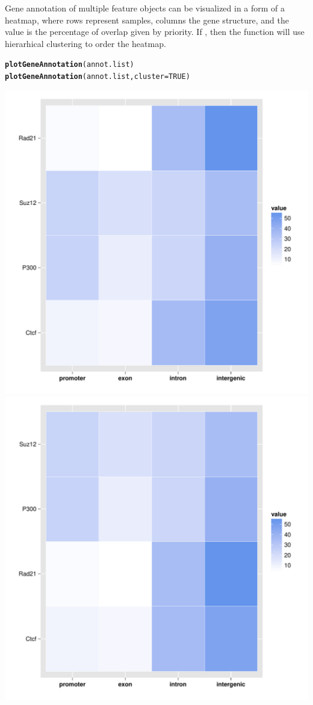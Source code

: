 \documentclass{article}\usepackage[]{graphicx}\usepackage[]{color}
\makeatletter
\newcommand{\hlnum}[1]{\textcolor[rgb]{0.686,0.059,0.569}{#1}}%
\newcommand{\hlstd}[1]{\textcolor[rgb]{0.345,0.345,0.345}{#1}}%
\newcommand{\hlkwc}[1]{\textcolor[rgb]{0.333,0.667,0.333}{#1}}%
\newcommand{\hlkwd}[1]{\textcolor[rgb]{0.737,0.353,0.396}{\textbf{#1}}}%
\newenvironment{kframe}{%
 \def\at@end@of@kframe{}%
 \ifinner\ifhmode%
  \def\at@end@of@kframe{\end{minipage}}%
  \begin{minipage}{\columnwidth}%
 \fi\fi%
 \def\FrameCommand##1{\hskip\@totalleftmargin \hskip-\fboxsep
 \colorbox{shadecolor}{##1}\hskip-\fboxsep
     \hskip-\linewidth \hskip-\@totalleftmargin \hskip\columnwidth}%
 \MakeFramed {\advance\hsize-\width
   \@totalleftmargin\z@ \linewidth\hsize
   \@setminipage}}%
 {\par\unskip\endMakeFramed%
 \at@end@of@kframe}
\newenvironment{knitrout}{}{} %
\makeatother
\begin{document}
Gene annotation of multiple feature objects can be visualized in a form of a heatmap, 
where rows represent samples, columns the gene structure, and the value is the 
percentage of overlap given by priority. If , then the function
will use hierarhical clustering to order the heatmap.
\begin{knitrout}
\color{fgcolor}\begin{kframe}
\begin{alltt}
\hlkwd{plotGeneAnnotation}\hlstd{(annot.list)}
\hlkwd{plotGeneAnnotation}\hlstd{(annot.list,} \hlkwc{cluster} \hlstd{=} \hlnum{TRUE}\hlstd{)}
\end{alltt}
\end{kframe}

{\centering \includegraphics[width=.49\linewidth]{inst/doc/FiguresplotGeneAnnotation1} 
\includegraphics[width=.49\linewidth]{inst/doc/FiguresplotGeneAnnotation2} 

}



\end{knitrout}



\newpage

\end{document}
